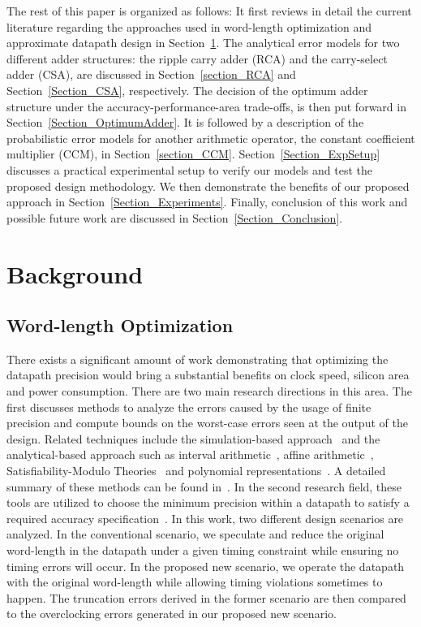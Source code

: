 \documentclass[prodmode,acmtrets]{acmsmall} %
\begin{document}
The rest of this paper is organized as follows: It first reviews in detail the current literature regarding the approaches used in word-length optimization and approximate datapath design in Section~\ref{Section_Background}. The analytical error models for two different adder structures: the ripple carry adder (RCA) and the carry-select adder (CSA), are discussed in Section~\ref{section_RCA} and Section~\ref{Section_CSA}, respectively. The decision of the optimum adder structure under the accuracy-performance-area trade-offs, is then put forward in Section~\ref{Section_OptimumAdder}. It is followed by a description of the probabilistic error models for another arithmetic operator, the constant coefficient multiplier (CCM), in Section~\ref{section_CCM}. Section~\ref{Section_ExpSetup} discusses a practical experimental setup to verify our models and test the proposed design methodology. We then demonstrate the benefits of our proposed approach in Section~\ref{Section_Experiments}. Finally, conclusion of this work and possible future work are discussed in Section~\ref{Section_Conclusion}.

\section{Background}\label{Section_Background}
\subsection{Word-length Optimization}\label{Section_Background_WL}
There exists a significant amount of work demonstrating that optimizing the datapath precision would bring a substantial benefits on clock speed, silicon area and power consumption. There are two main research directions in this area. The first discusses methods to analyze the errors caused by the usage of finite precision and compute bounds on the worst-case errors seen at the output of the design. Related techniques include the simulation-based approach~\cite{SungWLop_Simulation} and the analytical-based approach such as interval arithmetic~\cite{moore1966IA}, affine arithmetic~\cite{de2004affine}, Satisfiability-Modulo Theories~\cite{SAT2010} and polynomial representations~\cite{Boland2011TCAD}. A detailed summary of these methods can be found in~\cite{GeorgeDT11}. In the second research field, these tools are utilized to choose the minimum precision within a datapath to satisfy a required accuracy specification~\cite{RoldaoWLop_Simulation}. In this work, two different design scenarios are analyzed. In the conventional scenario, we speculate and reduce the original word-length in the datapath under a given timing constraint while ensuring no timing errors will occur. In the proposed new scenario, we operate the datapath with the original word-length while allowing timing violations sometimes to happen. The truncation errors derived in the former scenario are then compared to the overclocking errors generated in our proposed new scenario.
\end{document}
